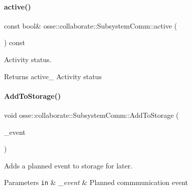 \paragraph{\texorpdfstring{active()}{active()}}
{\footnotesize\ttfamily const bool\& osse\+::collaborate\+::\+Subsystem\+Comm\+::active (\begin{DoxyParamCaption}{ }\end{DoxyParamCaption}) const\hspace{0.3cm}{\ttfamily [inline]}}



Activity status. 

\begin{DoxyReturn}{Returns}
active\+\_\+ Activity status 
\end{DoxyReturn}
\mbox{\label{classosse_1_1collaborate_1_1_subsystem_comm_ae50e83fd95a6bf1b918a0971833f9615}} 
\paragraph{\texorpdfstring{Add\+To\+Storage()}{AddToStorage()}\hspace{0.1cm}{\footnotesize\ttfamily [1/2]}}
{\footnotesize\ttfamily void osse\+::collaborate\+::\+Subsystem\+Comm\+::\+Add\+To\+Storage (\begin{DoxyParamCaption}\item[{\hyperlink{structosse_1_1collaborate_1_1_subsystem_comm_1_1_communication_event}{Subsystem\+Comm\+::\+Communication\+Event}}]{\+\_\+event }\end{DoxyParamCaption})}



Adds a planned event to storage for later. 


\begin{DoxyParams}[1]{Parameters}
\mbox{\tt in}  & {\em \+\_\+event} & Planned commmunication event \\
\hline
\end{DoxyParams}
\mbox{\label{classosse_1_1collaborate_1_1_subsystem_comm_a8167af09faf10dec260295c1542de585}} 
